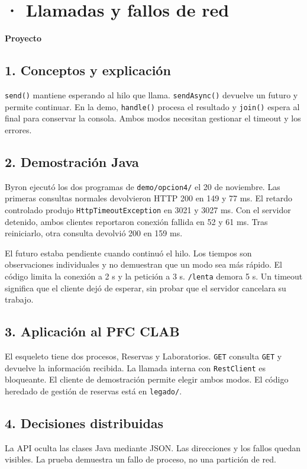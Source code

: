 \begingroup
\setlength{\parskip}{.25em}
\section*{\personaCuatro · Llamadas y fallos de red}
\textbf{Proyecto}\quad \proyectoCuatro

\subsection*{1. Conceptos y explicación}
\texttt{send()} mantiene esperando al hilo que llama. \texttt{sendAsync()} devuelve un futuro y permite continuar. En la demo, \texttt{handle()} procesa el resultado y \texttt{join()} espera al final para conservar la consola. Ambos modos necesitan gestionar el timeout y los errores.

\subsection*{2. Demostración Java}
Byron ejecutó los dos programas de \texttt{demo/opcion4/} el 20 de noviembre. Las primeras consultas normales devolvieron HTTP 200 en 149 y 77 ms. El retardo controlado produjo \texttt{HttpTimeoutException} en 3021 y 3027 ms. Con el servidor detenido, ambos clientes reportaron conexión fallida en 52 y 61 ms. Tras reiniciarlo, otra consulta devolvió 200 en 159 ms.

El futuro estaba pendiente cuando continuó el hilo. Los tiempos son observaciones individuales y no demuestran que un modo sea más rápido. El código limita la conexión a 2 s y la petición a 3 s. \texttt{/lenta} demora 5 s. Un timeout significa que el cliente dejó de esperar, sin probar que el servidor cancelara su trabajo.

\subsection*{3. Aplicación al PFC CLAB}
El esqueleto tiene dos procesos, Reservas y Laboratorios. \texttt{GET}  consulta \texttt{GET}  y devuelve la información recibida. La llamada interna con \texttt{RestClient} es bloqueante. El cliente de demostración permite elegir ambos modos. El código heredado de gestión de reservas está en \texttt{legado/}.

\subsection*{4. Decisiones distribuidas}
La API oculta las clases Java mediante JSON. Las direcciones y los fallos quedan visibles. La prueba demuestra un fallo de proceso, no una partición de red.

